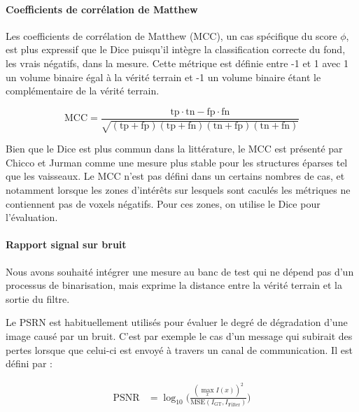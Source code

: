 \paragraph{Coefficients de corrélation de Matthew}

Les coefficients de corrélation de Matthew (MCC), un cas spécifique du score $\phi$, est plus  expressif que le Dice puisqu'il intègre la classification correcte du fond, les vrais négatifs, dans la mesure. Cette métrique est définie entre -1 et 1 avec 1 un volume binaire égal à la vérité terrain et -1 un volume binaire étant le complémentaire de la vérité terrain.

\begin{equation}
  \textrm{MCC} = \frac{\textrm{tp} \cdot \textrm{tn} - \textrm{fp} \cdot \textrm{fn}}{\sqrt{(\textrm{tp}+\textrm{fp})(\textrm{tp}+\textrm{fn})(\textrm{tn}+\textrm{fp})(\textrm{tn}+\textrm{fn})}}
\end{equation}

Bien que le Dice est plus commun dans la littérature, le MCC est présenté par Chicco et Jurman \cite{Chicco2020_advantages_MCC_Dice} comme une mesure plus stable pour les structures éparses tel que les vaisseaux. Le MCC n'est pas défini dans un certains nombres de cas, et notamment lorsque les zones d'intérêts sur lesquels sont caculés les métriques ne contiennent pas de voxels négatifs. Pour ces zones, on utilise le Dice pour l'évaluation. 


\paragraph{Rapport signal sur bruit}


Nous avons souhaité intégrer une mesure au banc de test qui ne dépend pas d'un processus de binarisation, mais exprime la distance entre la vérité terrain et la sortie du filtre.

Le PSRN est habituellement utilisés pour évaluer le degré de dégradation d'une image causé par un bruit. C'est par exemple le cas d'un message qui subirait des pertes lorsque que celui-ci est envoyé à travers un canal de communication. Il est défini par :

\begin{align}%
 \nonumber
  \textrm{PSNR} & = \log_{10}\Big( \frac{ (\max_x I(x))^2  }{ \textrm{MSE}( I_{\textrm{GT}}, I_{\textrm{Filter}} ) } \Big)
\end{align}

